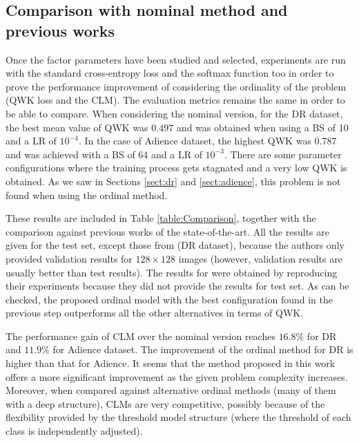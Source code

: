 \documentclass[preprint]{elsarticle}
\begin{document}
\subsection{Comparison with nominal method and previous works}
\label{sect:NominalComparison}
Once the factor parameters have been studied and selected, experiments are run with the standard cross-entropy loss and the softmax function too in order to prove the performance improvement of considering the ordinality of the problem (QWK loss and the CLM). The evaluation metrics remains the same in order to be able to compare. When considering the nominal version, for the DR dataset, the best mean value of QWK was $0.497$ and was obtained when using a BS of 10 and a LR of $10^{-4}$. In the case of Adience dataset, the highest QWK was $0.787$ and was achieved with a BS of 64 and a LR of $10^{-3}$. There are some parameter configurations where the training process gets stagnated and a very low QWK is obtained. As we saw in Sections \ref{sect:dr} and \ref{sect:adience}, this problem is not found when using the ordinal method. 

These results are included in Table \ref{table:Comparison}, together with the comparison against previous works of the state-of-the-art. All the results are given for the test set, except those from \cite{de2018weighted} (DR dataset), because the authors only provided validation results for $128\times 128$ images (however, validation results are usually better than test results). The results for \cite{beckham2017unimodal} were obtained by reproducing their experiments because they did not provide the results for test set. As can be checked, the proposed ordinal model with the best configuration found in the previous step outperforms all the other alternatives in terms of QWK. 

The performance gain of CLM over the nominal version reaches $16.8\%$ for DR and $11.9\%$ for Adience dataset. The improvement of the ordinal method for DR is higher than that for Adience. It seems that the method proposed in this work offers a more significant improvement as the given problem complexity increases. Moreover, when compared against alternative ordinal methods (many of them with a deep structure), CLMs are very competitive, possibly because of the flexibility provided by the threshold model structure (where the threshold of each class is independently adjusted).
\end{document}
